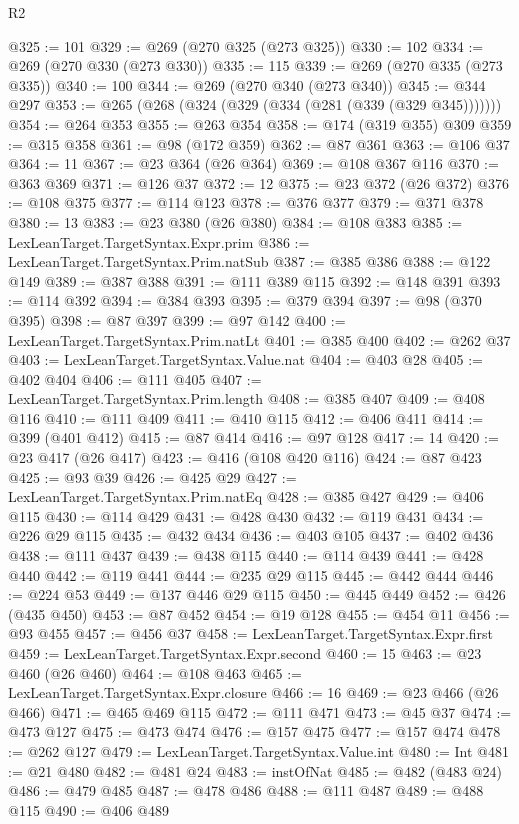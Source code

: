 \begin{lexlean}{R2}
\begin{coremodule}
@325 := 101
@329 := @269 (@270 @325 (@273 @325))
@330 := 102
@334 := @269 (@270 @330 (@273 @330))
@335 := 115
@339 := @269 (@270 @335 (@273 @335))
@340 := 100
@344 := @269 (@270 @340 (@273 @340))
@345 := @344 @297
@353 := @265 (@268 (@324 (@329 (@334 (@281 (@339 (@329 @345)))))))
@354 := @264 @353
@355 := @263 @354
@358 := @174 (@319 @355) @309
@359 := @315 @358
@361 := @98 (@172 @359)
@362 := @87 @361
@363 := @106 @37
@364 := 11
@367 := @23 @364 (@26 @364)
@369 := @108 @367 @116
@370 := @363 @369
@371 := @126 @37
@372 := 12
@375 := @23 @372 (@26 @372)
@376 := @108 @375
@377 := @114 @123
@378 := @376 @377
@379 := @371 @378
@380 := 13
@383 := @23 @380 (@26 @380)
@384 := @108 @383
@385 := LexLeanTarget.TargetSyntax.Expr.prim
@386 := LexLeanTarget.TargetSyntax.Prim.natSub
@387 := @385 @386
@388 := @122 @149
@389 := @387 @388
@391 := @111 @389 @115
@392 := @148 @391
@393 := @114 @392
@394 := @384 @393
@395 := @379 @394
@397 := @98 (@370 @395)
@398 := @87 @397
@399 := @97 @142
@400 := LexLeanTarget.TargetSyntax.Prim.natLt
@401 := @385 @400
@402 := @262 @37
@403 := LexLeanTarget.TargetSyntax.Value.nat
@404 := @403 @28
@405 := @402 @404
@406 := @111 @405
@407 := LexLeanTarget.TargetSyntax.Prim.length
@408 := @385 @407
@409 := @408 @116
@410 := @111 @409
@411 := @410 @115
@412 := @406 @411
@414 := @399 (@401 @412)
@415 := @87 @414
@416 := @97 @128
@417 := 14
@420 := @23 @417 (@26 @417)
@423 := @416 (@108 @420 @116)
@424 := @87 @423
@425 := @93 @39
@426 := @425 @29
@427 := LexLeanTarget.TargetSyntax.Prim.natEq
@428 := @385 @427
@429 := @406 @115
@430 := @114 @429
@431 := @428 @430
@432 := @119 @431
@434 := @226 @29 @115
@435 := @432 @434
@436 := @403 @105
@437 := @402 @436
@438 := @111 @437
@439 := @438 @115
@440 := @114 @439
@441 := @428 @440
@442 := @119 @441
@444 := @235 @29 @115
@445 := @442 @444
@446 := @224 @53
@449 := @137 @446 @29 @115
@450 := @445 @449
@452 := @426 (@435 @450)
@453 := @87 @452
@454 := @19 @128
@455 := @454 @11
@456 := @93 @455
@457 := @456 @37
@458 := LexLeanTarget.TargetSyntax.Expr.first
@459 := LexLeanTarget.TargetSyntax.Expr.second
@460 := 15
@463 := @23 @460 (@26 @460)
@464 := @108 @463
@465 := LexLeanTarget.TargetSyntax.Expr.closure
@466 := 16
@469 := @23 @466 (@26 @466)
@471 := @465 @469 @115
@472 := @111 @471
@473 := @45 @37
@474 := @473 @127
@475 := @473 @474
@476 := @157 @475
@477 := @157 @474
@478 := @262 @127
@479 := LexLeanTarget.TargetSyntax.Value.int
@480 := Int
@481 := @21 @480
@482 := @481 @24
@483 := instOfNat
@485 := @482 (@483 @24)
@486 := @479 @485
@487 := @478 @486
@488 := @111 @487
@489 := @488 @115
@490 := @406 @489

\end{coremodule}
\end{lexlean}
